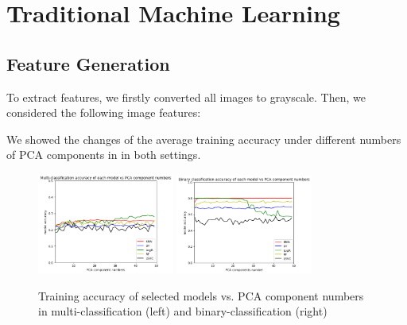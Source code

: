 \section{Traditional Machine Learning}

\subsection{Feature Generation}

To extract features, we firstly converted all images to grayscale. Then, we 
considered the following image features:




We showed the changes of the average training accuracy under different numbers of PCA 
components in  in both settings. 




\begin{figure}[t]
\centering
\includegraphics[width=0.4\textwidth]{multi_class.jpeg}
\includegraphics[width=0.4\textwidth]{binrary_class.jpeg}
\caption{Training accuracy of selected models vs. PCA component numbers in 
multi-classification (left) and binary-classification (right)}
\label{pcamulti}
\end{figure}


